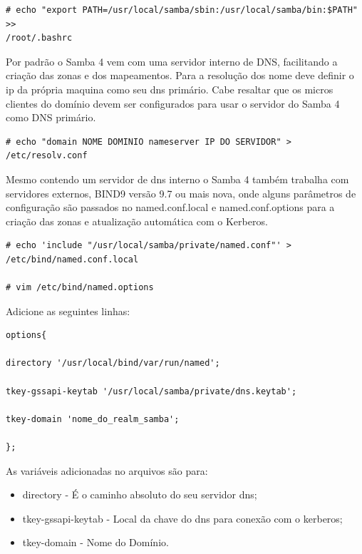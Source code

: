 \begin{lstlisting}
# echo "export PATH=/usr/local/samba/sbin:/usr/local/samba/bin:$PATH" >> 
/root/.bashrc
\end{lstlisting}

Por padrão o Samba 4 vem com uma servidor interno de DNS, facilitando a criação das zonas e dos mapeamentos. Para a resolução dos nome deve definir o ip da própria maquina como seu dns primário. Cabe resaltar que os micros clientes do domínio devem ser configurados para usar o servidor do Samba 4 como DNS primário.\\

\begin{lstlisting}
# echo "domain NOME DOMINIO nameserver IP DO SERVIDOR" > /etc/resolv.conf
\end{lstlisting}

Mesmo contendo um servidor de dns interno o Samba 4 também trabalha com servidores externos, BIND9 versão 9.7 ou mais nova, onde alguns parâmetros de configuração são passados no named.conf.local e named.conf.options para a criação das zonas e atualização automática com o Kerberos.\\

\begin{lstlisting}
# echo 'include "/usr/local/samba/private/named.conf"' > 
/etc/bind/named.conf.local

# vim /etc/bind/named.options
\end{lstlisting}

Adicione as seguintes linhas:\\

\begin{lstlisting}
options{ 
	
directory '/usr/local/bind/var/run/named'; 

tkey-gssapi-keytab '/usr/local/samba/private/dns.keytab'; 

tkey-domain 'nome_do_realm_samba';
	
};
\end{lstlisting}

As variáveis adicionadas no arquivos são para:

\begin{itemize}
	\item{directory} -  É o caminho absoluto do seu servidor dns;
	\item{tkey-gssapi-keytab} - Local da chave do dns para conexão com o kerberos;
	\item{tkey-domain} - Nome do Domínio.
\end{itemize}

